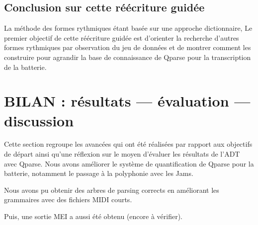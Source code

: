 \subsection*{Conclusion sur cette réécriture guidée}
La méthode des formes rythmiques étant basée sur une approche dictionnaire,
Le premier objectif de cette réécriture guidée est d’orienter la recherche
d’autres formes rythmiques par observation du jeu de données et de montrer
comment les construire pour agrandir la base de connaissance de Qparse pour la
transcription de la batterie.

\section{BILAN : résultats — évaluation — discussion}

Cette section regroupe les avancées qui ont été réalisées par rapport aux
objectifs de départ ainsi qu’une réflexion sur le moyen d’évaluer les résultats
de l’ADT avec Qparse. Nous avons améliorer le système de quantification de
Qparse pour la batterie, notamment le passage à la polyphonie avec les Jams. 

Nous avons pu obtenir des arbres de parsing corrects en améliorant les
grammaires avec des fichiers MIDI courts. 

Puis, une sortie MEI a aussi été obtenu (encore à vérifier).



